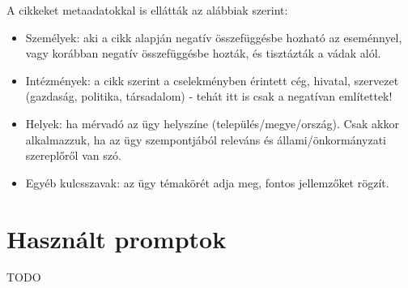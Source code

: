 A cikkeket metaadatokkal is ellátták az alábbiak szerint:

\begin{itemize}
	\item Személyek: aki a cikk alapján negatív összefüggésbe hozható az eseménnyel, vagy korábban negatív összefüggésbe hozták, és tisztázták a vádak alól.
	\item Intézmények: a cikk szerint a cselekményben érintett cég, hivatal, szervezet (gazdaság, politika, társadalom) - tehát itt is csak a negatívan említettek!
	\item Helyek: ha mérvadó az ügy helyszíne (település/megye/ország). Csak akkor alkalmazzuk, ha az ügy szempontjából releváns és állami/önkormányzati szereplőről van szó.
	\item Egyéb kulcsszavak: az ügy témakörét adja meg, fontos jellemzőket rögzít. 
\end{itemize}

\clearpage\section{Használt promptok}

TODO



